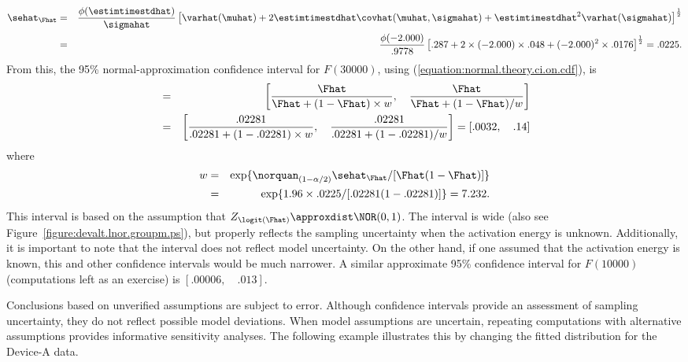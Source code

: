 \begin{example}
\begin{eqnarray*}
	\sehat_{\Fhat}
	&=& \frac{  \phi(\estimtimestdhat )  }{\sigmahat} \left[ \varhat(\muhat) + 
	 2 \estimtimestdhat \covhat(\muhat,\sigmahat) +
	\estimtimestdhat^2 \varhat(\sigmahat) \right]^{\frac{1}{2}}\\
	&=& \frac{  \phi( -2.000 )  }{.9778  } \left[ .287 + 
	 2 \times  (-2.000) \times .048 +
	(-2.000)^2 \times .0176 \right]  ^ {\frac{1}{2}} = .0225.
\end{eqnarray*}
From this, the 95\% normal-approximation confidence interval for $F(30000)$, 
using (\ref{equation:normal.theory.ci.on.cdf}), is
\begin{eqnarray*}
	  [ \Flower(\estimtime), \quad	\Fupper(\estimtime) ] &= &
	\left[\frac{\Fhat}{\Fhat
	+(1-\Fhat) \times w}, \quad \frac{\Fhat}{\Fhat+
	(1-\Fhat)/w}\right]\\ &= &
	\left[\frac{.02281}{.02281
	+(1-.02281) \times w}, \quad \frac{.02281}{.02281+
	(1-.02281)/w}\right] =[.0032, \quad .14 ]
\end{eqnarray*}
where
\begin{eqnarray*}
w&=&\exp\{\norquan_{(1-\alpha/2)}
	\sehat_{\Fhat}/[\Fhat(1-\Fhat)]\}\\
  &=&\exp\{1.96 \times .0225/[.02281(1-.02281)]\} = 7.232.
\end{eqnarray*}
This interval is based on the assumption that $Z_{\logit(\Fhat)}\approxdist
\NOR(0,1)$. The interval is wide
(also see Figure~\ref{figure:devalt.lnor.groupm.ps}),
but properly reflects the sampling uncertainty when the activation energy is
unknown. Additionally, it is important to note that the interval does
not reflect model uncertainty. On the other hand, if one 
assumed that the activation energy is known, this and other confidence
intervals would be much narrower.
A similar approximate 95\% confidence interval for $F(10000)$
(computations left as an exercise) is $[.00006, \quad .013]$.
\end{example}

Conclusions based on unverified assumptions are subject to
error. Although confidence intervals provide an assessment of sampling
uncertainty, they do not reflect possible model deviations.
When model assumptions are uncertain, repeating computations with
alternative assumptions provides informative sensitivity analyses.
The following example illustrates this by changing the fitted distribution
for the Device-A data.

